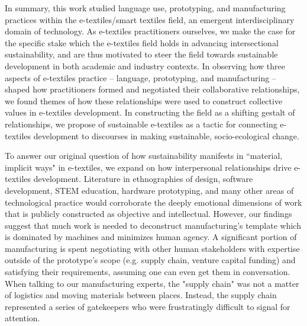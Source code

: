 In summary, this work studied language use, prototyping, and manufacturing practices within the e-textiles/smart textiles field, an emergent interdisciplinary domain of technology. As e-textiles practitioners ourselves, we make the case for the specific stake which the e-textiles field holds in advancing intersectional sustainability, and are thus motivated to steer the field towards sustainable development in both academic and industry contexts. In observing how three aspects of e-textiles practice -- language, prototyping, and manufacturing -- shaped how practitioners formed and negotiated their collaborative relationships, we 
found themes of how these relationships were used to construct collective values in e-textiles development. In constructing the field as a shifting gestalt of relationships, we propose  of sustainable e-textiles as a tactic for connecting e-textiles development to discourses in making sustainable, socio-ecological change.

To answer our original question of how sustainability manifests in ``material, implicit ways" in e-textiles, we expand on how interpersonal relationships drive e-textiles development. Literature in ethnographies of design, software development, STEM education, hardware prototyping, and many other areas of technological practice would corroborate the deeply emotional dimensions of work that is publicly constructed as objective and intellectual. However, our findings suggest that much work is needed to deconstruct manufacturing's template which is dominated by machines and minimizes human agency. 
A significant portion of manufacturing is spent negotiating with other human stakeholders with expertise outside of the prototype's scope (e.g. supply chain, venture capital funding) and satisfying their requirements, assuming one can even get them in conversation. When talking to our manufacturing experts, the "supply chain" was not a matter of logistics and moving materials between places. Instead, the supply chain represented a series of gatekeepers who were frustratingly difficult to signal for attention. 


